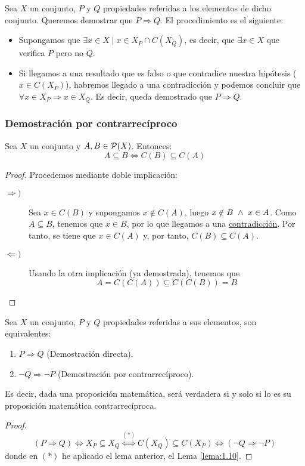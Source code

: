 Sea $X$ un conjunto, $P$ y $Q$ propiedades referidas a los elementos de dicho conjunto. Queremos demostrar que $P \Rightarrow Q$. El procedimiento es el siguiente:

\begin{itemize}
    \item Supongamos que $\exists x \in X \mid x \in X_P\cap C(X_Q)$, es decir, que $\exists x\in X$ que verifica $P$ pero no $Q$.
    
    \item Si llegamos a una resultado que es falso o que contradice nuestra hipótesis ($x\in C(X_P)$), habremos llegado a una contradicción y podemos concluir que $\forall x \in X_P \Longrightarrow x \in X_Q$. Es decir, queda demostrado que $P \Longrightarrow Q$.
\end{itemize}

\subsubsection{Demostración por contrarrecíproco}

\begin{lema}\label{lema:1.10}
    Sea $X$ un conjunto y $A, B \in \mathcal{P}(X)$. Entonces:
    $$A \subseteq B \Longleftrightarrow C(B) \subseteq C(A)$$
\end{lema}
\begin{proof} Procedemos mediante doble implicación:
\begin{description}
    \item [$\Longrightarrow)$] Sea $x \in C(B)$ y supongamos $x \notin C(A)$, luego $x \notin B \ \land \  x \in A$. Como $A\subseteq B$, tenemos que $x\in B$, por lo que llegamos a una \underline{contradicción}. Por tanto, se tiene que $x\in C(A)$ y, por tanto, $C(B)\subseteq C(A)$.

    \item [$\Longleftarrow)$] Usando la otra implicación (ya demostrada), tenemos que $$A = C(C(A)) \subseteq C(C(B)) = B$$
\end{description}
\end{proof}

\begin{prop}
    Sea $X$ un conjunto, $P$ y $Q$ propiedades referidas a sus elementos, son equivalentes:
    \begin{enumerate}
        \item $P \Rightarrow Q$ (Demostración directa).
        \item $\neg Q \Rightarrow \neg P$ (Demostración por contrarrecíproco).
    \end{enumerate}
    Es decir, dada una proposición matemática, será verdadera si y solo si lo es su proposición matemática contrarrecíproca.
\end{prop}
\begin{proof}
\begin{equation*}
    (P \Rightarrow Q) \Leftrightarrow X_P \subseteq X_Q
    \stackrel{(\ast)}{\Longleftrightarrow}
    C(X_Q) \subseteq C(X_P) \Longleftrightarrow (\neg Q \Rightarrow \neg P)
\end{equation*}
donde en $(\ast)$ he aplicado el lema anterior, el Lema \ref{lema:1.10}.
\end{proof}

